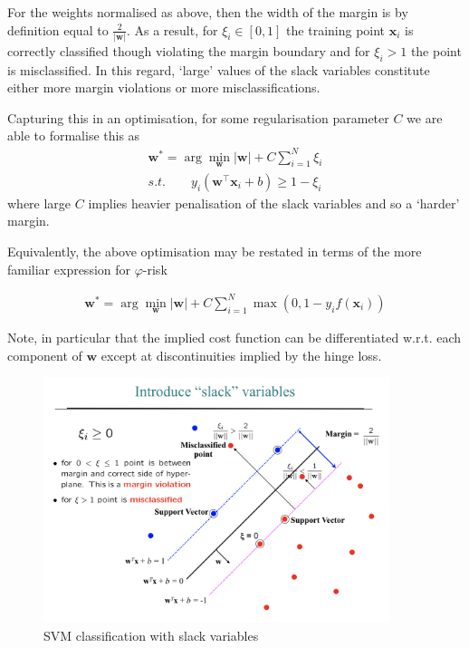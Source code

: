 For the weights normalised as above, then the width of the margin is by definition equal to $\frac{2}{|\mathbf{w}|}$. As a result, for $\xi_i \in [0,1]$ the training point $\mathbf{x}_i$ is correctly classified though violating the margin boundary and for $\xi_i>1$ the point is misclassified. In this regard, `large' values of the slack variables constitute either more margin violations or more misclassifications. 

Capturing this in an optimisation, for some regularisation parameter $C$ we are able to formalise this as
\begin{align}
\mathbf{w}^*=\arg\min_\mathbf{w} |\mathbf{w} |+ C\sum_{i=1}^N\xi_i\\
 s.t. \qquad y_i(\mathbf{w}^\top\mathbf{x}_i+b)\ge1-\xi_i
\end{align}
where large $C$ implies heavier penalisation of the slack variables and so a `harder' margin.

Equivalently, the above optimisation may be restated in terms of the more familiar expression for $\varphi$-risk

\begin{align}
\mathbf{w}^*=\arg\min_\mathbf{w} |\mathbf{w} |+ C\sum_{i=1}^N\max(0,1-y_if(\mathbf{x}_i))
\end{align}

Note, in particular that the implied cost function can be differentiated w.r.t. each component of $\mathbf{w}$ except at discontinuities implied by the hinge loss.

\begin{figure}
\center
\includegraphics[width=0.9\textwidth]{img/slack_var.png}
\caption{SVM classification with slack variables}
\label{fig:svm_slack}
\end{figure}


